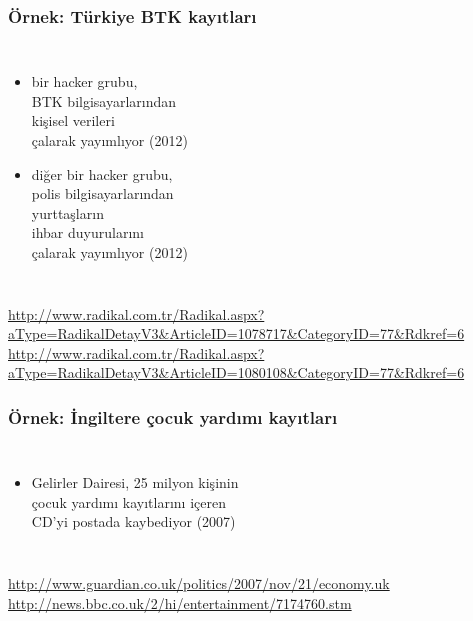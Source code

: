 \documentclass[dvipsnames]{beamer}
\theoremstyle{plain}
\begin{document}
\begin{frame}
  \frametitle{Örnek: Türkiye BTK kayıtları}

  \begin{columns}

    \begin{itemize}
      \item bir hacker grubu,\\
        BTK bilgisayarlarından\\
        kişisel verileri\\
        çalarak yayımlıyor (2012)
      \item diğer bir hacker grubu,\\
        polis bilgisayarlarından\\
        yurttaşların\\
        ihbar duyurularını\\
        çalarak yayımlıyor (2012)
    \end{itemize}
  \end{columns}

  \medskip
  \tiny{\url{http://www.radikal.com.tr/Radikal.aspx?aType=RadikalDetayV3&ArticleID=1078717&CategoryID=77&Rdkref=6}}\\
  \tiny{\url{http://www.radikal.com.tr/Radikal.aspx?aType=RadikalDetayV3&ArticleID=1080108&CategoryID=77&Rdkref=6}}\\
\end{frame}

\begin{frame}
  \frametitle{Örnek: İngiltere çocuk yardımı kayıtları}

  \begin{columns}

    \begin{itemize}
      \item Gelirler Dairesi, 25 milyon kişinin\\
        çocuk yardımı kayıtlarını içeren\\
        CD'yi postada kaybediyor (2007)
    \end{itemize}
  \end{columns}

  \medskip
  \tiny{\url{http://www.guardian.co.uk/politics/2007/nov/21/economy.uk}}\\
  \tiny{\url{http://news.bbc.co.uk/2/hi/entertainment/7174760.stm}}\\
\end{frame}
\end{document}
